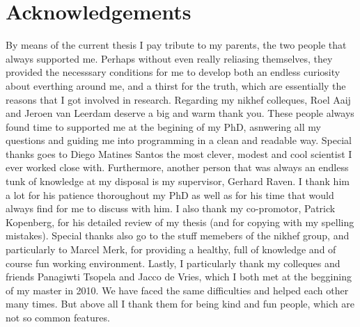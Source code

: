\chapter*{Acknowledgements}
\chaptermark{}

By means of the current thesis I pay tribute to my parents, the two people that always
supported me. Perhaps without even really reliasing themselves, they provided the necesssary conditions
for me to develop both an endless curiosity about everthing around me, and a thirst for the truth,
which are essentially the reasons that I got involved in research. Regarding my nikhef colleques,
Roel Aaij and Jeroen van Leerdam deserve a big and warm thank you. These people always found time to
supported me at the begining of my PhD, asnwering all my questions and guiding me into programming in
a clean and readable way. Special thanks goes to Diego Matines Santos the most clever, modest
and cool scientist I ever worked close with. Furthermore, another person that was always an endless
tunk of knowledge at my disposal is my supervisor, Gerhard Raven. I thank him a lot for his patience
thoroughout my PhD as well as for his time that would always find for me to discuss with him.
I also thank my co-promotor, Patrick Kopenberg, for his detailed review of my thesis (and for
copying with my spelling mistakes). Special thanks also go to the stuff memebers of the nikhef
\lhcb group, and particularly to Marcel Merk, for providing a healthy, full of knowledge and of
course fun working environment. Lastly, I particularly thank my colleques and friends Panagiwti
Tsopela and Jacco de Vries, which I both met at the beggining of my master in 2010. We have
faced the same difficulties and helped each other many times. But above all I thank them for
being kind and fun people, which are not so common features.
